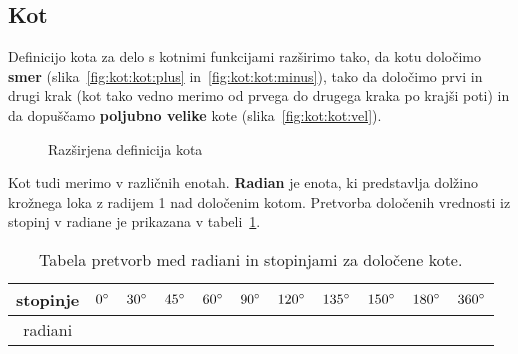 \documentclass[a4paper,oneside,12pt,fleqn]{article}
\newcommand{\beforecaptionskip}{\vspace{-12pt}}
\def\deg{\degree}
\newcommand{\mltc}[1]{\pbox{21cm}{\vspace{0.5mm} #1 \vspace{0.5mm}}}
\numberwithin{equation}{section}
\begin{document}
\subsection{Kot}
\label{sec:kot:kot}
Definicijo kota za delo s kotnimi funkcijami raz\v{s}irimo tako, da kotu dolo\v{c}imo
\textbf{smer} (slika~\ref{fig:kot:kot:plus} in~\ref{fig:kot:kot:minus}), tako da določimo prvi in drugi krak (kot tako vedno merimo od prvega do drugega
kraka po krajši poti) in da dopuščamo \textbf{poljubno velike} kote
(slika~\ref{fig:kot:kot:vel}).

\begin{figure}[ht]
  \begin{center}
  \end{center}
  \beforecaptionskip
  \caption{Razširjena definicija kota}
  \label{fig:kot:kot}
\end{figure}

Kot tudi merimo v različnih enotah. \textbf{Radian} je enota, ki predstavlja dolžino krožnega loka
z radijem 1 nad določenim kotom. Pretvorba določenih vrednosti iz stopinj v radiane je
prikazana v tabeli~\ref{tab:kot:kot:degrad}.

\begin{table}[h]
  \centering
  \caption{Tabela pretvorb med radiani in stopinjami za določene kote.}
  \vspace{5pt}
  \label{tab:kot:kot:degrad}
  \begin{tabular}{c|c|c|c|c|c|c|c|c|c|c}
    stopinje & $ 0\deg $ & $ 30\deg $ & $ 45\deg $ & $ 60\deg $ & $ 90\deg $ & $ 120\deg $ & $ 135\deg $ & $ 150\deg $ & $ 180\deg $ & $ 360\deg $ \\ \hline
    radiani & \mltc{$ 0     $} & \mltc{$ \frac{\pi}{6}$} & \mltc{$ \frac{\pi}{4}$} &
    \mltc{$ \frac{\pi}{3}$} & \mltc{$ \frac{\pi}{2}$} & \mltc{$ \frac{2\pi}{2}$} &
    \mltc{$ \frac{3\pi}{4}$} & \mltc{$ \frac{5\pi}{6}$} & \mltc{$ \pi$} & \mltc{$ 2\pi$} \\
  \end{tabular}
\end{table}
\end{document}
